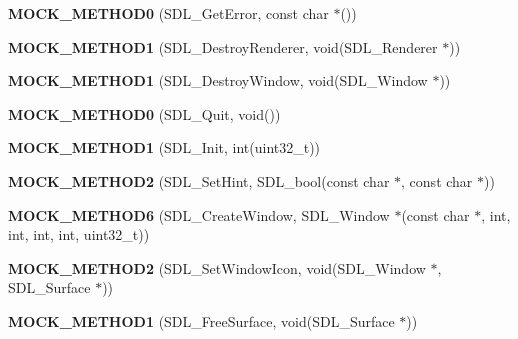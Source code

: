 \begin{DoxyCompactItemize}
\item 
\mbox{\label{classSDLMock_a0922c5ef963abd254c463063b81a1407}} 
{\bfseries M\+O\+C\+K\+\_\+\+M\+E\+T\+H\+O\+D0} (S\+D\+L\+\_\+\+Get\+Error, const char $\ast$())
\item 
\mbox{\label{classSDLMock_a8c253aa6691f49a181d589ce5d3cb141}} 
{\bfseries M\+O\+C\+K\+\_\+\+M\+E\+T\+H\+O\+D1} (S\+D\+L\+\_\+\+Destroy\+Renderer, void(S\+D\+L\+\_\+\+Renderer $\ast$))
\item 
\mbox{\label{classSDLMock_a1270866dc6be83a224a53734883fa60c}} 
{\bfseries M\+O\+C\+K\+\_\+\+M\+E\+T\+H\+O\+D1} (S\+D\+L\+\_\+\+Destroy\+Window, void(S\+D\+L\+\_\+\+Window $\ast$))
\item 
\mbox{\label{classSDLMock_acb91d7819df1b2bc453173db9ed70389}} 
{\bfseries M\+O\+C\+K\+\_\+\+M\+E\+T\+H\+O\+D0} (S\+D\+L\+\_\+\+Quit, void())
\item 
\mbox{\label{classSDLMock_aa555627d7f34fb08a442aab406a5619c}} 
{\bfseries M\+O\+C\+K\+\_\+\+M\+E\+T\+H\+O\+D1} (S\+D\+L\+\_\+\+Init, int(uint32\+\_\+t))
\item 
\mbox{\label{classSDLMock_ad846bdb6738a4e9daeffaf118b78fd78}} 
{\bfseries M\+O\+C\+K\+\_\+\+M\+E\+T\+H\+O\+D2} (S\+D\+L\+\_\+\+Set\+Hint, S\+D\+L\+\_\+bool(const char $\ast$, const char $\ast$))
\item 
\mbox{\label{classSDLMock_ab1f3a182c097e7f56e622cb9a475669e}} 
{\bfseries M\+O\+C\+K\+\_\+\+M\+E\+T\+H\+O\+D6} (S\+D\+L\+\_\+\+Create\+Window, S\+D\+L\+\_\+\+Window $\ast$(const char $\ast$, int, int, int, int, uint32\+\_\+t))
\item 
\mbox{\label{classSDLMock_a8d6247ca471a04b9a63e8121bcbca7ff}} 
{\bfseries M\+O\+C\+K\+\_\+\+M\+E\+T\+H\+O\+D2} (S\+D\+L\+\_\+\+Set\+Window\+Icon, void(S\+D\+L\+\_\+\+Window $\ast$, S\+D\+L\+\_\+\+Surface $\ast$))
\item 
\mbox{\label{classSDLMock_a658576368c9a958936a638bd91453ea5}} 
{\bfseries M\+O\+C\+K\+\_\+\+M\+E\+T\+H\+O\+D1} (S\+D\+L\+\_\+\+Free\+Surface, void(S\+D\+L\+\_\+\+Surface $\ast$))

\end{DoxyCompactItemize}
